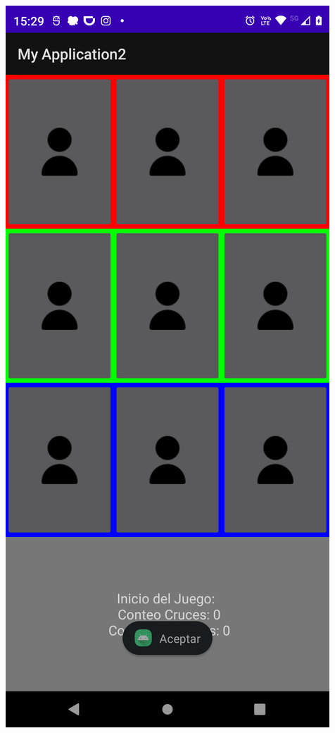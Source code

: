 \begin{frame}[fragile]
\begin{columns}
\begin{center}
\end{center}
\begin{center}
\includegraphics[width=0.95\linewidth]{00_ComportamientoAplicacionTicTacToe/Etapa3_Fase1B.png}  
\end{center}
\end{columns}
\end{frame}

